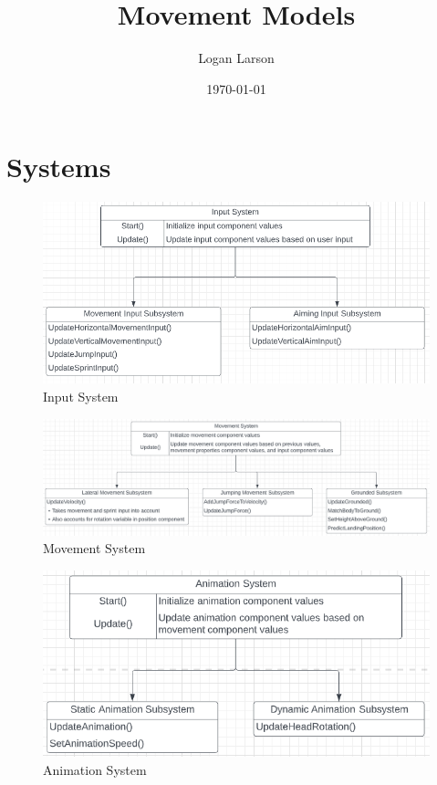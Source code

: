 \documentclass{article}
\title{Movement Models}
\author{Logan Larson}
\date{\today}
\begin{document}
\maketitle

\section*{Systems}

\begin{figure}[!htb]
\includegraphics[width=\textwidth]{InputSystem}
	\caption{Input System}
\end{figure}

\begin{figure}
\includegraphics[width=\textwidth]{MovementSystem}
	\caption{Movement System}
\end{figure}

\begin{figure}
\includegraphics[width=\textwidth]{AnimationSystem}
	\caption{Animation System}
\end{figure}
\end{document}
